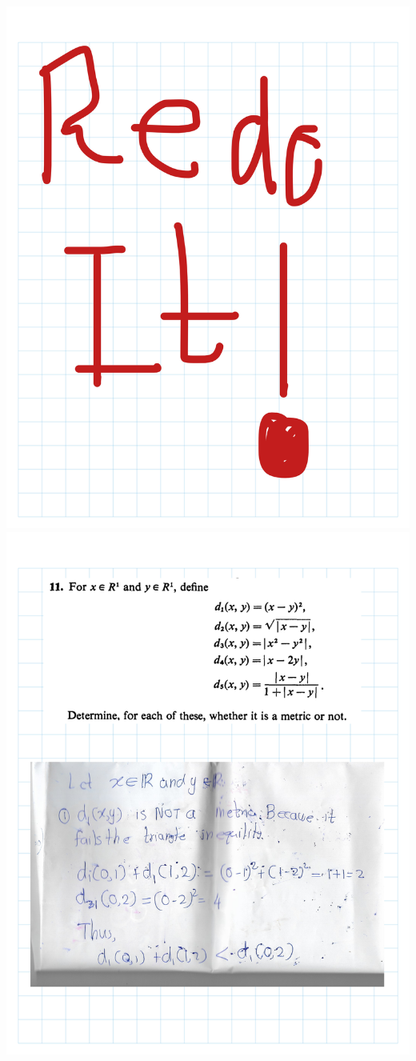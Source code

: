 \documentclass[
]{book}
\theoremstyle{definition}
\theoremstyle{definition}
\theoremstyle{definition}
\theoremstyle{definition}
\theoremstyle{remark}
\begin{document}
\includegraphics{Figures/Ex-2/Rudin Ch2-1/Rudin Ch2-1-15.png}
\includegraphics{Figures/Ex-2/Rudin Ch2-1/Rudin Ch2-1-16.png}
\end{document}
